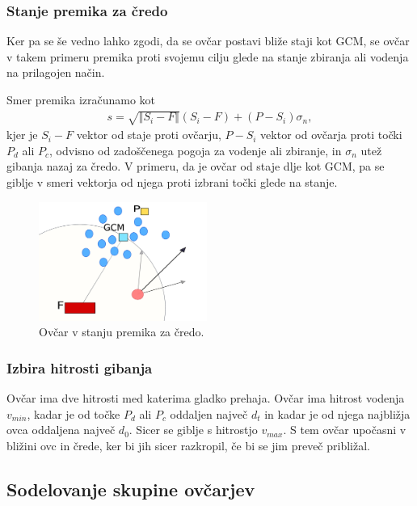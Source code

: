 \subsubsection{Stanje premika za čredo}

Ker pa se še vedno lahko zgodi, da se ovčar postavi bliže staji kot GCM, se ovčar v takem primeru premika proti svojemu cilju glede na stanje zbiranja ali vodenja na prilagojen način.

Smer premika izračunamo kot
\begin{align}
s = \sqrt{\Vert S_i - F\Vert}(S_i - F) + (P - S_i) \sigma_n, \label{eq:zadaj}
\end{align}
kjer je $S_i - F$ vektor od staje proti ovčarju, $P - S_i$ vektor od ovčarja proti točki $P_d$ ali $P_c$, odvisno od zadoščenega pogoja za vodenje ali zbiranje, in $\sigma_n$ utež gibanja nazaj za čredo. V primeru, da je ovčar od staje dlje kot GCM, pa se giblje v smeri vektorja od njega proti izbrani točki glede na stanje.

\begin{figure}[ht]  %
	\centering
	\includegraphics[width=0.49\textwidth]{../poglavja/images/zadaj.pdf}
	\caption[Stanje premika za čredo]{Ovčar v stanju premika za čredo.} %
	\label{fig:zadaj}
\end{figure}

\subsubsection{Izbira hitrosti gibanja}

Ovčar ima dve hitrosti med katerima gladko prehaja. Ovčar ima hitrost vodenja $v_{min}$, kadar je od točke $P_d$ ali $P_c$ oddaljen največ $d_t$ in kadar je od njega najbližja ovca oddaljena največ $d_0$. Sicer se giblje s hitrostjo $v_{max}$. S tem ovčar upočasni v bližini ovc in črede, ker bi jih sicer razkropil, če bi se jim preveč približal.

\subsection{Sodelovanje skupine ovčarjev}\label{sodelovanje}

